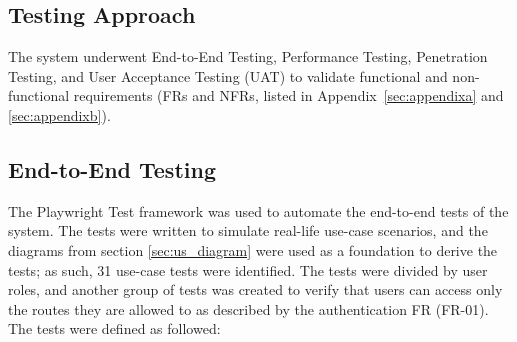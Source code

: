 \subsection{Testing Approach}

The system underwent End-to-End Testing, Performance Testing, Penetration Testing, and User Acceptance Testing (UAT) to validate functional and non-functional requirements (FRs and NFRs, listed in Appendix~\ref{sec:appendixa} and \ref{sec:appendixb}).

\FloatBarrier

\subsection{End-to-End Testing}

The Playwright Test framework was used to automate the end-to-end tests of the system. 
The tests were written to simulate real-life use-case scenarios, and the diagrams from section \ref{sec:us_diagram} were used as a foundation to derive the tests; as such, 31 use-case tests were identified. 
The tests were divided by user roles, and another group of tests was created to verify that users can access only the routes they are allowed to as described by the authentication FR (FR-01). 
The tests were defined as followed:

